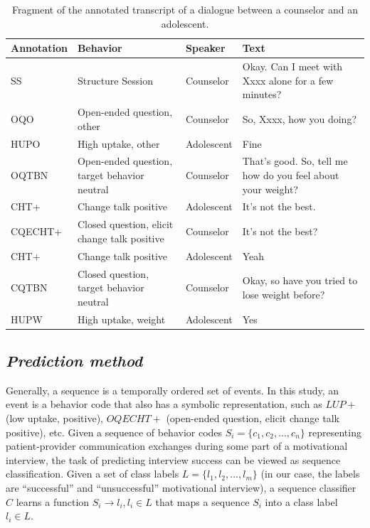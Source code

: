 \documentclass{amia_summit_2018}
\begin{document}
\begin{table}[h]
\caption{Fragment of the annotated transcript of a dialogue between a counselor and an adolescent.}    
\label{tab:anno_examp}
\centering
\begin{tabular}{|l|p{3.2cm}|l|p{8cm}|}
\hline
\bf{Annotation}  & \bf{Behavior} & \bf{Speaker} & \bf{Text} \\\hline
SS & Structure Session & Counselor & Okay. Can I meet with Xxxx alone for a few minutes? \\\hline
OQO & Open-ended question, other & Counselor & So, Xxxx, how you doing? \\\hline
HUPO &    High uptake, other    & Adolescent &    Fine \\\hline
OQTBN &    Open-ended question, target behavior neutral & Counselor &    That's good.  So, tell me  how do you feel about your weight? \\\hline
CHT+ &    Change talk positive    & Adolescent &    It's not the best. \\\hline
CQECHT+ & Closed question, elicit change talk positive & Counselor & It's not the best? \\\hline
CHT+ &    Change talk positive &    Adolescent & Yeah \\\hline
CQTBN &    Closed question, target behavior neutral  & Counselor &    Okay, so have you tried to lose weight before? \\\hline
HUPW &    High uptake, weight & Adolescent &    Yes \\\hline
\end{tabular}
\end{table}  

\subsection*{\textit{Prediction method}}
Generally, a sequence is a temporally ordered set of events. In this study, an event is a behavior code that also has a symbolic representation, such as $LUP+$ (low uptake, positive), $OQECHT+$ (open-ended question, elicit change talk positive), etc.  Given a sequence of behavior codes $S_i = \{c_1, c_2,...,c_n\}$ representing patient-provider communication exchanges during some part of a motivational interview, the task of predicting interview success can be viewed as sequence classification. Given a set of class labels $L = \{l_1, l_2,...,l_m\}$ (in our case, the labels are ``successful'' and ``unsuccessful'' motivational interview), a sequence classifier $C$ learns a function $S_i \to l_i, l_i \in L$ that maps a sequence $S_i$ into a class label $l_i \in L$.
\end{document}
